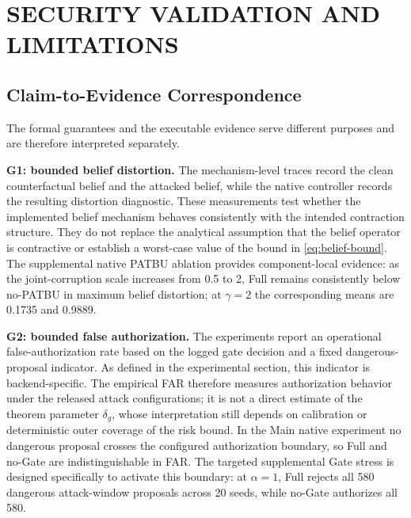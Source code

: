 \section{SECURITY VALIDATION AND LIMITATIONS}

\subsection{Claim-to-Evidence Correspondence}
The formal guarantees and the executable evidence serve different purposes and are therefore interpreted separately.

\textbf{G1: bounded belief distortion.}
The mechanism-level traces record the clean counterfactual belief and the attacked belief, while the native controller records the resulting distortion diagnostic. These measurements test whether the implemented belief mechanism behaves consistently with the intended contraction structure. They do not replace the analytical assumption that the belief operator is contractive or establish a worst-case value of the bound in \eqref{eq:belief-bound}. The supplemental native PATBU ablation provides component-local evidence: as the joint-corruption scale increases from 0.5 to 2, Full remains consistently below no-PATBU in maximum belief distortion; at $\gamma=2$ the corresponding means are 0.1735 and 0.9889.

\textbf{G2: bounded false authorization.}
The experiments report an operational false-authorization rate based on the logged gate decision and a fixed dangerous-proposal indicator. As defined in the experimental section, this indicator is backend-specific. The empirical FAR therefore measures authorization behavior under the released attack configurations; it is not a direct estimate of the theorem parameter $\delta_g$, whose interpretation still depends on calibration or deterministic outer coverage of the risk bound. In the Main native experiment no dangerous proposal crosses the configured authorization boundary, so Full and no-Gate are indistinguishable in FAR. The targeted supplemental Gate stress is designed specifically to activate this boundary: at $\alpha=1$, Full rejects all 580 dangerous attack-window proposals across 20 seeds, while no-Gate authorizes all 580.

